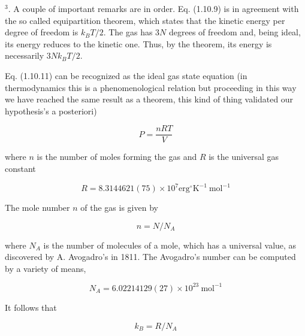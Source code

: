 \documentclass{article}
\begin{document}
${ }^{3}$. A couple of important remarks are in order.
Eq. (1.10.9) is in agreement with the so called equipartition theorem, which states that the kinetic energy per degree of freedom is $k_{B} T / 2$. The gas has $3 N$ degrees of freedom and, being ideal, its energy reduces to the kinetic one. Thus, by the theorem, its energy is necessarily $3 N k_{B} T / 2$.

Eq. (1.10.11) can be recognized as the ideal gas state equation (in thermodynamics this is a phenomenological relation but proceeding in this way we have reached the same result as a theorem, this kind of thing validated our hypothesis's a posteriori)
 
\begin{equation*}
P=\frac{n R T}{V} \tag{1.10.12}
\end{equation*}
 
where $n$ is the number of moles forming the gas and $R$ is the universal gas constant
 
\begin{equation*}
R=8.3144621(75) \times 10^{7} \mathrm{erg}^{\circ} \mathrm{K}^{-1} \mathrm{~mol}^{-1} \tag{1.10.13}
\end{equation*}
 


The mole number $n$ of the gas is given by
 
\begin{equation*}
n=N / N_{A} \tag{1.10.14}
\end{equation*}
 
where $N_{A}$ is the number of molecules of a mole, which has a universal value, as discovered by A. Avogadro's in 1811. The Avogadro's number can be computed by a variety of means,
 
\begin{equation*}
N_{A}=6.02214129(27) \times 10^{23} \mathrm{~mol}^{-1} \tag{1.10.15}
\end{equation*}
 

It follows that
 
\begin{equation*}
k_{B}=R / N_{A} \tag{1.10.16}
\end{equation*}
 
\end{document}
